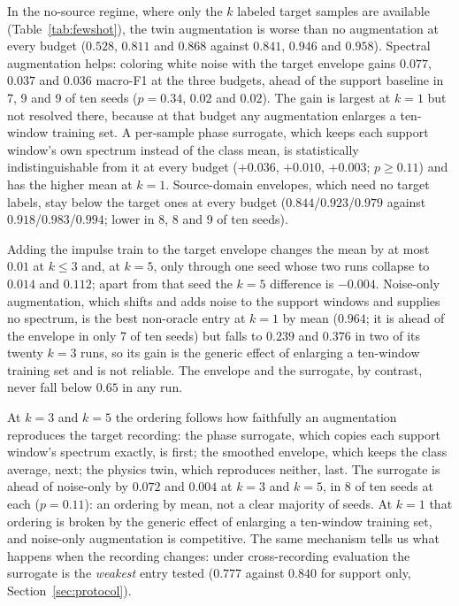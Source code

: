 \documentclass[journal]{IEEEtran}
\begin{document}
In the no-source regime, where only the $k$ labeled target samples are
available (Table~\ref{tab:fewshot}), the twin augmentation is worse than no
augmentation at every budget ($0.528$, $0.811$ and $0.868$ against $0.841$,
$0.946$ and $0.958$). Spectral
augmentation helps: coloring white noise with the target envelope gains
$0.077$, $0.037$ and $0.036$ macro-F1 at the three budgets, ahead of the
support baseline in 7, 9 and 9 of ten seeds ($p=0.34$, $0.02$ and $0.02$).
The gain is largest at $k=1$ but not resolved there, because at that budget
any augmentation enlarges a ten-window training set. A per-sample phase surrogate,
which keeps each support window's own spectrum instead of the class mean, is
statistically indistinguishable from it at every budget ($+0.036$, $+0.010$,
$+0.003$; $p\ge0.11$) and has the higher mean at $k=1$. Source-domain
envelopes, which need no target labels, stay below the target ones at every
budget ($0.844$/$0.923$/$0.979$ against $0.918$/$0.983$/$0.994$; lower in 8, 8 and 9
of ten seeds).

Adding the impulse train to the
target envelope changes the mean by at most $0.01$ at $k\le3$ and, at $k=5$,
only through one seed whose two runs collapse to $0.014$ and $0.112$; apart
from that seed the $k=5$ difference is $-0.004$. Noise-only augmentation, which
shifts and adds noise to the support windows and supplies no spectrum, is the
best non-oracle entry at $k=1$ by mean ($0.964$; it is ahead of the envelope
in only 7 of ten seeds) but falls to $0.239$ and $0.376$ in
two of its twenty $k=3$ runs, so its gain is the generic effect of enlarging a
ten-window training set and is not reliable. The envelope and the surrogate,
by contrast, never fall below $0.65$ in any run.

At $k=3$ and $k=5$ the ordering follows how faithfully an augmentation
reproduces the target recording: the phase surrogate, which copies each
support window's spectrum exactly, is first; the smoothed envelope, which
keeps the class average, next; the physics twin, which reproduces neither,
last. The surrogate is ahead of noise-only by $0.072$ and $0.004$ at $k=3$ and
$k=5$, in 8 of ten seeds at each ($p=0.11$): an ordering by mean, not a
clear majority of seeds. At $k=1$ that ordering is broken by the generic effect of enlarging a
ten-window training set, and noise-only augmentation is competitive. The
same mechanism tells us what happens when the recording changes: under
cross-recording evaluation the surrogate is the \emph{weakest} entry tested
($0.777$ against $0.840$ for support only, Section~\ref{sec:protocol}).
\end{document}
